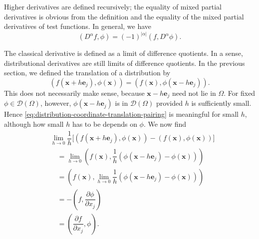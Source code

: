 \begin{Remark}
\label{rem:distribution-higher-derivatives}
Higher derivatives are defined recursively; the equality of mixed partial derivatives is obvious from the definition and the equality of the mixed partial derivatives of test functions. In general, we have
\begin{equation}\label{eq:distribution-higher-derivative-pairing}
(D^\alpha f,\phi)=(-1)^{|\alpha|}(f,D^\alpha\phi).
\end{equation}

\end{Remark}

\begin{Remark}
\label{rem:distribution-difference-quotients}
The classical derivative is defined as a limit of difference quotients. In a sense, distributional derivatives are still limits of difference quotients. In the previous section, we defined the translation of a distribution by
\begin{equation}\label{eq:distribution-coordinate-translation-pairing}
(f(\bm{x}+h\bm{e}_j),\phi(\bm{x}))=(f(\bm{x}),\phi(\bm{x}-h\bm{e}_j)).
\end{equation}
This does not necessarily make sense, because $\bm{x}-h\bm{e}_j$ need not lie in $\Omega$. For fixed $\phi\in\mathcal{D}(\Omega)$, however, $\phi(\bm{x}-h\bm{e}_j)$ is in $\mathcal{D}(\Omega)$ provided $h$ is sufficiently small. Hence \eqref{eq:distribution-coordinate-translation-pairing} is meaningful for small $h$, although how small $h$ has to be depends on $\phi$. We now find\[
\begin{aligned}
&\lim_{h\to0}\dfrac1h\bigl[(f(\bm{x}+h\bm{e}_j),\phi(\bm{x}))-(f(\bm{x}),\phi(\bm{x}))\bigr]\\
&\quad=\lim_{h\to0}\left(f(\bm{x}),\dfrac1h(\phi(\bm{x}-h\bm{e}_j)-\phi(\bm{x}))\right)\\
&\quad=\left(f(\bm{x}),\lim_{h\to0}\dfrac1h(\phi(\bm{x}-h\bm{e}_j)-\phi(\bm{x}))\right)\\
&\quad=-\left(f,\dfrac{\partial\phi}{\partial x_j}\right)\\
&\quad=\left(\dfrac{\partial f}{\partial x_j},\phi\right).
\end{aligned}
\]
\end{Remark}
